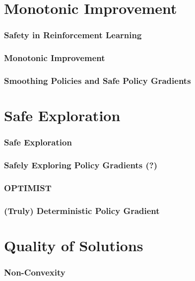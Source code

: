 \documentclass{beamer}
\begin{document}
\section{Monotonic Improvement}
\addtocounter{framenumber}{-1}
\frame{\tableofcontents[currentsection]}
\begin{frame}
\frametitle{Safety in Reinforcement Learning}
\end{frame}

\begin{frame}
\frametitle{Monotonic Improvement}
\end{frame}

\begin{frame}
\frametitle{Smoothing Policies and Safe Policy Gradients}
\end{frame}

\section{Safe Exploration}
\addtocounter{framenumber}{-1}
\frame{\tableofcontents[currentsection]}

\begin{frame}
\frametitle{Safe Exploration}
\end{frame}

\begin{frame}
\frametitle{Safely Exploring Policy Gradients (?)}
\end{frame}

\begin{frame}
\frametitle{OPTIMIST}
\end{frame}

\begin{frame}
\frametitle{(Truly) Deterministic Policy Gradient}
\end{frame}

\section{Quality of Solutions}
\addtocounter{framenumber}{-1}
\frame{\tableofcontents[currentsection]}

\begin{frame}
\frametitle{Non-Convexity}
\end{frame}
\end{document}
